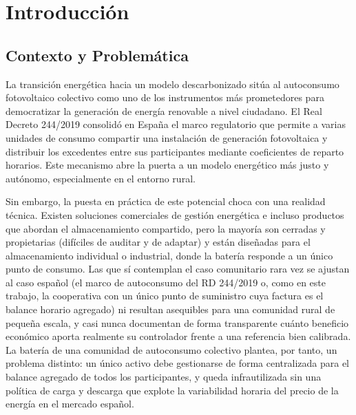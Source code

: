 \documentclass[12pt, a4paper, twoside]{report}
\begin{document}
\tableofcontents
\listoffigures
{}
\listoftables
{}
\printglossary[type=acronym, title={Glosario de Acrónimos}]

\setcounter{page}{1}

\chapter{Introducción}
\label{chap:intro}

\section{Contexto y Problemática}

La transición energética hacia un modelo descarbonizado sitúa al autoconsumo
fotovoltaico colectivo como uno de los instrumentos más prometedores para
democratizar la generación de energía renovable a nivel ciudadano. El Real
Decreto 244/2019 consolidó en España el marco regulatorio que permite a varias
unidades de consumo compartir una instalación de generación fotovoltaica y
distribuir los excedentes entre sus participantes mediante coeficientes de
reparto horarios. Este mecanismo abre la puerta a un modelo energético más
justo y autónomo, especialmente en el entorno rural.

Sin embargo, la puesta en práctica de este potencial choca con una realidad
técnica. Existen soluciones comerciales de gestión energética e incluso
productos que abordan el almacenamiento compartido, pero la mayoría son cerradas
y propietarias (difíciles de auditar y de adaptar) y están diseñadas para el
almacenamiento individual o industrial, donde la batería responde a un único
punto de consumo. Las que sí contemplan el caso comunitario rara vez se ajustan
al caso español (el marco de autoconsumo del RD 244/2019 o, como en este
trabajo, la cooperativa con un único punto de suministro cuya factura es el
balance horario agregado) ni resultan
asequibles para una comunidad rural de pequeña escala, y casi nunca documentan
de forma transparente cuánto beneficio económico aporta realmente su controlador
frente a una referencia bien calibrada. La batería de una comunidad de
autoconsumo colectivo plantea, por tanto, un problema distinto: un único activo
debe gestionarse de forma centralizada para el balance agregado de todos los
participantes, y queda infrautilizada sin una política de carga y descarga que
explote la variabilidad horaria del precio de la energía en el mercado español.
\end{document}
